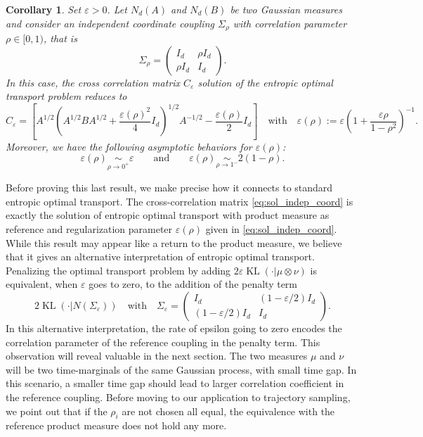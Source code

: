 \documentclass[]{article}
\DeclareMathOperator{\KL}{KL}
\numberwithin{equation}{section}
\theoremstyle{plain}
\newtheorem{cor}{Corollary}[section]
\begin{document}
\begin{cor}
	Set $\varepsilon > 0$. Let $N_d(A)$ and $N_d(B)$ be two Gaussian measures and consider an independent coordinate coupling $\Sigma_{\rho}$ with correlation parameter $\rho\in[0,1)$, that is 
	\begin{equation}
	\Sigma_{\rho}=\begin{pmatrix}
		I_d & \rho I_d \\
		\rho I_d & I_d
		\end{pmatrix}.
	\end{equation}
In this case, the cross correlation matrix $C_{\varepsilon}$ solution of the entropic optimal transport problem reduces to
\begin{equation}\label{eq:sol_indep_coord}
	C_{\varepsilon} = \left[A^{1/2}\left( A^{1/2}B A^{1/2} +\frac{\varepsilon(\rho)^2}{4}I_d\right)^{1/2}A^{-1/2} - \frac{\varepsilon(\rho)}{2}I_d\right] \quad \text{with} \quad \varepsilon(\rho) := \varepsilon\left(1+\frac{\varepsilon \rho}{1-\rho^2} \right)^{-1}.
\end{equation}
Moreover, we have the following asymptotic behaviors for $\varepsilon(\rho)$:
\begin{equation}\label{eq:asymptotic_rho_eps}
\varepsilon(\rho)  \underset{\rho \rightarrow 0^{+}}{\sim} \varepsilon \qquad \text{and} \qquad \varepsilon(\rho)  \underset{\rho \rightarrow 1^{-}}{\sim} 2(1-\rho).
\end{equation}

\end{cor}

Before proving this last result, we make precise how it connects to standard entropic optimal transport. The cross-correlation matrix \eqref{eq:sol_indep_coord} is exactly the solution of entropic optimal transport with product measure as reference and regularization parameter $\varepsilon(\rho)$ given in \eqref{eq:sol_indep_coord}. While this result may appear like a return to the product measure, we believe that it gives an alternative interpretation of entropic optimal transport. Penalizing the optimal transport problem by adding $2\varepsilon \KL(\cdot | \mu \otimes \nu)$ is equivalent, when $\varepsilon$ goes to zero, to the addition of the penalty term
\begin{equation}
	2 \KL(\cdot | N(\Sigma_{\varepsilon})) \quad \text{with} \quad \Sigma_{\varepsilon} = \begin{pmatrix}
		I_d & (1-\varepsilon/2)I_d \\
		(1-\varepsilon/2)I_d & I_d
	\end{pmatrix}.
\end{equation}
In this alternative interpretation, the rate of epsilon going to zero encodes the correlation parameter of the reference coupling in the penalty term. This observation will reveal valuable in the next section. The two measures $\mu$ and $\nu$ will be two time-marginals of the same Gaussian process, with small time gap. In this scenario, a smaller time gap should lead to larger correlation coefficient in the reference coupling. Before moving to our application to trajectory sampling, we point out that if the $\rho_i$ are not chosen all equal, the equivalence with the reference product measure does not hold any more.
 
\end{document}
